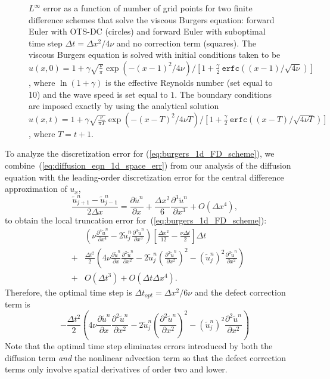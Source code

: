 \documentclass[fleqn,12pt,twoside]{article}
\newcommand{\beq}{\begin{equation}}
\newcommand{\eeq}{\end{equation}}
\newcommand{\bea}{\begin{eqnarray}}
\newcommand{\eea}{\end{eqnarray}}
\def\px{\partial x}
\def\tu{\tilde{u}}
\def\dt{\Delta t}
\def\dx{\Delta x}
\def\dto{\dt_{opt}}
\begin{document}
\begin{figure}[tb]
\begin{center}
\caption{$L^\infty$ error as a function of number of grid points for
two finite difference schemes that solve the viscous Burgers equation:
forward Euler with OTS-DC (circles)
and forward Euler with suboptimal time step $\dt = \dx^2/4\nu$ and no 
correction term (squares).
The viscous Burgers equation is solved with initial conditions taken to be 
$u(x,0) = 1 + \gamma \sqrt{\frac{\nu}{\pi}} \exp\left( -(x-1)^2/4 \nu \right) 
            / \left[ 1 + \frac{\gamma}{2} \ 
                         \mathtt{erfc}\left((x-1)/\sqrt{4\nu} \right) 
    \right]$,
where $\ln(1+\gamma)$ is the effective Reynolds number (set equal to 10) and 
the wave speed is set equal to $1$.  The boundary conditions are imposed 
exactly by using
the analytical solution
$u(x,t) = 1 + \gamma \sqrt{\frac{\nu}{\pi T}} 
              \exp\left( -(x-T)^2/4 \nu T \right) 
            / \left[ 1 + \frac{\gamma}{2} \ 
                         \mathtt{erfc}\left((x-T)/\sqrt{4\nu T} \right) 
    \right]$,
where $T = t+1$.
}
\label{fig:burgers_1d_error}
\end{center}
\end{figure}

To analyze the discretization error for (\ref{eq:burgers_1d_FD_scheme}), 
we combine~(\ref{eq:diffusion_eqn_1d_space_err}) from our analysis of 
the diffusion equation with the leading-order discretization error for 
the central difference approximation of $u_x$,
\beq
  \frac{\tu^{n}_{j+1} - \tu^{n}_{j-1}}{2 \dx}  =
  \frac{\partial \tu^n}{\px} 
  + \frac{\dx^2}{6} \frac{\partial^3 \tu^n}{\px^3} 
  + O(\dx^4),
  \label{eq:burgers_1d_ux_err}
\eeq
to obtain the local truncation error for~(\ref{eq:burgers_1d_FD_scheme}): 
\bea
  & &
      \left( \nu \frac{\partial^4 \tu^n}{\px^4} 
           - 2 \tu^n_j \frac{\partial^3 \tu^n}{\px^3} \right)
      \left[ \frac{\dx^2}{12} - \frac{\nu \dt}{2}  \right] \dt
  \nonumber \\
  &+& \frac{\dt^2}{2} 
      \left( 
           4 \nu \frac{\partial \tu^n}{\px} \frac{\partial^2 \tu^n}{\px^2}
         - 2 \tu^n_j \left( \frac{\partial^2 \tu^n}{\px^2} \right)^2
         - \left(\tu^n_j\right)^2 \frac{\partial^2 \tu^n}{\px^2}
      \right) 
  \nonumber \\
  &+& O(\dt^3) + O(\dt \dx^4).
  \label{eq:burgers_1d_err_eqn}
\eea
Therefore, the optimal time step is $\dto = \dx^2/6\nu$ and the defect 
correction term is
\beq
  - \frac{\dt^2}{2} 
      \left( 
           4 \nu \frac{\partial \tu^n}{\px} \frac{\partial^2 \tu^n}{\px^2}
         - 2 \tu^n_j \left( \frac{\partial^2 \tu^n}{\px^2} \right)^2
         - \left(\tu^n_j\right)^2 \frac{\partial^2 \tu^n}{\px^2}
      \right)
  \label{eq:burgers_1d_corr_term}
\eeq 
Note that the optimal time step eliminates errors introduced by 
both the diffusion term \emph{and} the nonlinear advection term so that the
defect correction terms only involve spatial derivatives of order two and
lower.
\end{document}
